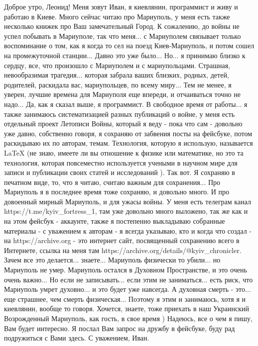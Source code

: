  
 
 
 
 

Доброе утро, Леонид! Меня зовут Иван, я киевлянин, программист и живу и работаю
в Киеве. Много сейчас читаю про Мариуполь, у меня есть также несколько книжек
про Ваш замечательный Город. К сожалению, до войны не успел побывать в
Мариуполе, так что меня... с Мариуполем связывает только воспоминание о том,
как я когда то сел на поезд Киев-Мариуполь, и потом сошел на промежуточной
станции... Давно это уже было... Но... я принимаю близко к сердцу, все, что
произошло с Мариуполем и с мариупольцами. Страшная, невообразимая трагедия...
которая забрала ваших близких, родных, детей, родителей, раскидала вас,
мариупольцев, по всему миру... Тем не менее, я уверен, лучшие времена для
Мариуполя еще впереди, и отчаиваться точно не надо... Да, как я сказал выше, я
программист. В свободное время от работы... я также занимаюсь систематизацией
разных публикаций о войне, у меня есть отдельный проект Летописи Войны, который
я веду - пока что сам - довольно уже давно, собственно говоря, я сохраняю от
забвения посты на фейсбуке, потом раскидываю их по авторам, темам. Технология,
которую я использую, называется LaTeX (не знаю, имеете ли вы отношение к физике
или математике, но это та технология, которая повсеместно используется учеными
в научном мире для записи и публикации своих статей и исследований ). Так вот.
Я сохраняю в печатном виде, то, что я читаю, считаю важным для сохранения...
Про Мариуполь я в последнее время тоже сохраняю, и довольно много. И про
довоенный мирный Мариуполь, и для ужасы войны. У меня есть телеграм канал
https://t.me/kyiv_fortress_1, там уже довольно много выложено, так же как и на
этом фейсбук - аккаунте, также я постепенно выкладываю собранные  материалы - с
уважением к авторам - я всегда указываю, кто и когда что создал - на
https://archive.org - это интернет сайт, посвященный сохранению всего в
Интернете, ссылка на меня там https://archive.org/details/@kyiv_chronicler.
Зачем все это делается... знаете... Мариуполь физически то убили... но
Мариуполь не умер. Мариуполь остался в Духовном Пространстве, и это очень очень
важно... Но если не записывать... если этим не заниматься... есть риск, что
Мариуполь умрет духовно... и это будет уже навсегда. А духовная смерть - это...
еще страшнее, чем смерть физическая... Поэтому я этим и занимаюсь, хотя я и
киевлянин, вообще то говоря. Хочется, знаете, тоже приехать в наш Украинский
Возрожденный Мариуполь, как гость, в свое время ) Надеюсь, все о чем я пишу,
Вам будет интересно. Я послал Вам запрос на дружбу в фейсбуке, буду рад
подружиться с Вами здесь. С уважением, Иван.

